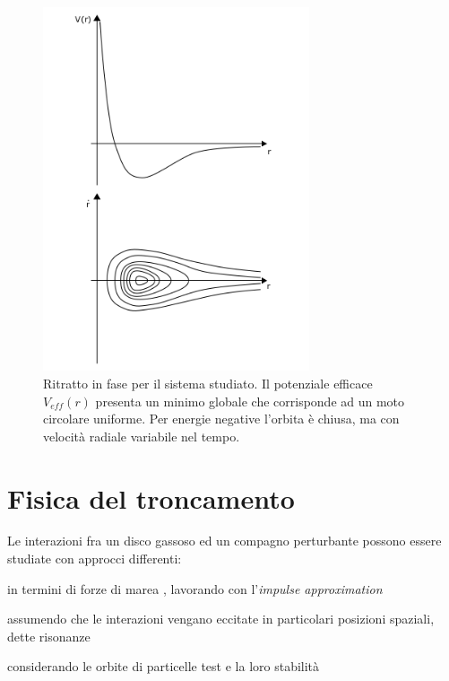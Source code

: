 \begin{figure}[H]
  \centering
  \includegraphics[width=0.7\textwidth]{Immagini/IntroTeorica/RitrattoFase.png}
  \caption{Ritratto in fase per il sistema studiato. Il potenziale efficace $V_{eff}(r)$ presenta un minimo globale che corrisponde ad un moto circolare uniforme. Per energie negative l'orbita è chiusa, ma con velocità radiale variabile nel tempo.}
  \label{fig:ritr_fase}
\end{figure}

\section{Fisica del troncamento} \label{sec:fis_tronc}

Le interazioni fra un disco gassoso ed un compagno perturbante possono essere studiate con approcci differenti:
\begin{list}{\textbf{-}}{\setlength{\itemsep}{0cm}}
    \item in termini di forze di marea \parencite{PapaloizouPringle1977}, lavorando con l'\textit{impulse approximation} \parencite{LinPapaloizou1979}
    \item assumendo che le interazioni vengano eccitate in particolari posizioni spaziali, dette risonanze
    \item considerando le orbite di particelle test e la loro stabilità
\end{list}

